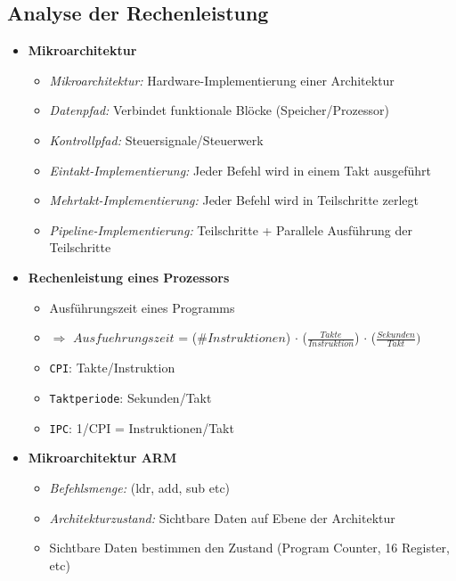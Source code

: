 \subsection{Analyse der Rechenleistung}
    \begin{itemize}
        \item \textbf{Mikroarchitektur}
            \begin{itemize}
                \item \textit{Mikroarchitektur:} Hardware-Implementierung einer Architektur
                \item \textit{Datenpfad:} Verbindet funktionale Blöcke (Speicher/Prozessor)
                \item \textit{Kontrollpfad:} Steuersignale/Steuerwerk
                \item \textit{Eintakt-Implementierung:} Jeder Befehl wird in einem Takt ausgeführt
                \item \textit{Mehrtakt-Implementierung:} Jeder Befehl wird in Teilschritte zerlegt
                \item \textit{Pipeline-Implementierung:} Teilschritte + Parallele Ausführung der Teilschritte
            \end{itemize}
        \item \textbf{Rechenleistung eines Prozessors}
            \begin{itemize}
                \item Ausführungszeit eines Programms
                \item[] $\Rightarrow$ $Ausfuehrungszeit$ = (\#$Instruktionen$) $\cdot$ ($\frac{Takte}{Instruktion}$) $\cdot$ ($\frac{Sekunden}{Takt})$
                \item \texttt{CPI}: Takte/Instruktion
                \item \texttt{Taktperiode}: Sekunden/Takt
                \item \texttt{IPC}: 1/CPI = Instruktionen/Takt
            \end{itemize}
\pagebreak
        \item \textbf{Mikroarchitektur ARM}
            \begin{itemize}
                \item \textit{Befehlsmenge:} (ldr, add, sub etc)
                \item \textit{Architekturzustand:} Sichtbare Daten auf Ebene der Architektur
                \item Sichtbare Daten bestimmen den Zustand (Program Counter, 16 Register, etc)

\end{itemize}
\end{itemize}
